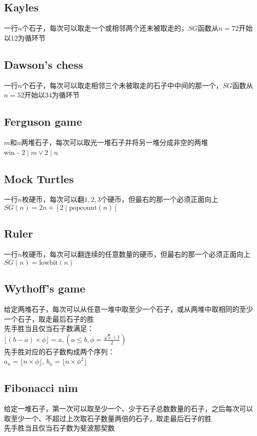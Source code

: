     \subsection*{Kayles}
        一行$ n $个石子，每次可以取走一个或相邻两个还未被取走的，$ SG $函数从$ n = 72 $开始以$ 12 $为循环节
    \subsection*{Dawson's chess}
        一行$ n $个石子，每次可以取走相邻三个未被取走的石子中中间的那一个，$ SG $函数从$ n = 52 $开始以$ 34 $为循环节
    \subsection*{Ferguson game}
        $ m $和$ n $两堆石子，每次可以取光一堆石子并将另一堆分成非空的两堆\\
        win - $ 2 \mid m \lor 2 \mid n $
    \subsection*{Mock Turtles}
        一行$ n $枚硬币，每次可以翻$ 1, 2, 3 $个硬币，但最右的那一个必须正面向上\\
        $ SG(n) = 2n + [2 \mid \text{popcount}(n)] $
    \subsection*{Ruler}
        一行$ n $枚硬币，每次可以翻连续的任意数量的硬币，但最右的那一个必须正面向上\\
        $ SG(n) = \text{lowbit}(n) $
    \subsection*{Wythoff's game}
        给定两堆石子，每次可以从任意一堆中取至少一个石子，或从两堆中取相同的至少一个石子，取走最后石子的胜
        \\先手胜当且仅当石子数满足：
        \\$\lfloor (b - a) \times \phi \rfloor=a, (a \leq b, \phi = \frac{\sqrt{5} + 1}{2})$
        \\先手胜对应的石子数构成两个序列：
        \\$a_n = \lfloor n \times \phi \rfloor$, $b_n = \lfloor n \times \phi ^ 2 \rfloor$
    \subsection*{Fibonacci nim}
        给定一堆石子，第一次可以取至少一个、少于石子总数数量的石子，之后每次可以取至少一个、不超过上次取石子数量两倍的石子，取走最后石子的胜
        \\先手胜当且仅当石子数为斐波那契数
